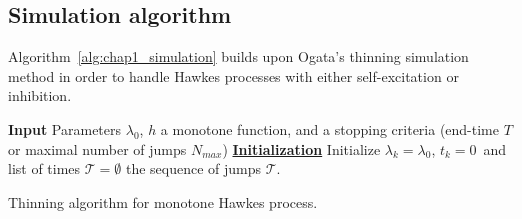 \begin{subappendices}
\section{Simulation algorithm}
\label{app:chap1_simulation}

Algorithm~\ref{alg:chap1_simulation} builds upon Ogata's thinning simulation method \cite[Proposition 1]{Ogata1981} in order to handle Hawkes processes with either self-excitation or inhibition.

\begin{algorithm}[!ht]
\SetAlgoLined
 \textbf{Input} Parameters $\lambda_0$, $h$ a monotone function, and a stopping criteria (end-time $T$ or maximal number of jumps $N_{max}$)\;
 \textbf{\underline{Initialization}} Initialize $\lambda_k =\lambda_0$, $t_k=0$\ and list of times $\mathcal{T} = \emptyset$\;
 \Return the sequence of jumps $\mathcal{T}$.
 \caption{Thinning algorithm for monotone Hawkes process.}
 \label{alg:chap1_simulation}
\end{algorithm}

\end{subappendices}